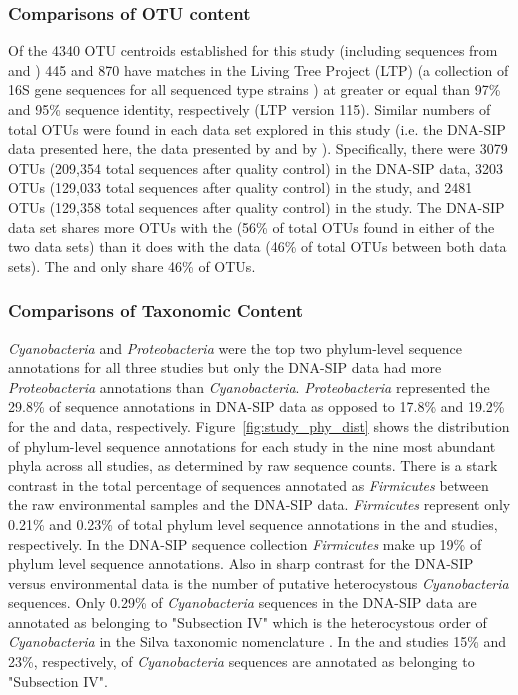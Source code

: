 \subsubsection{Comparisons of OTU content}
Of the 4340 OTU centroids established for this study (including sequences from \citet{Steven_2013} and \citep{Garcia_Pichel_2013}) 445 and 870 have matches in the Living Tree Project (LTP) (a collection of 16S gene sequences for all sequenced type strains \citep{Yarza_2008}) at greater or equal than 97\% and 95\% sequence identity, respectively (LTP version 115). Similar numbers of total OTUs were found in each data set explored in this study (i.e. the DNA-SIP data presented here, the data presented by \citet{Steven_2013} and by \citet{Garcia_Pichel_2013}). Specifically, there were 3079 OTUs (209,354 total sequences after quality control) in the DNA-SIP data, 3203 OTUs (129,033 total sequences after quality control) in the \citet{Garcia_Pichel_2013} study, and 2481 OTUs (129,358 total sequences after quality control) in the \citet{Steven_2013} study. The DNA-SIP data set shares more OTUs with the \citet{Steven_2013} (56\% of total OTUs found in either of the two data sets) than it does with the \citet{Garcia_Pichel_2013} data (46\% of total OTUs between both data sets). The \citet{Steven_2013} and \citet{Garcia_Pichel_2013} only share 46\% of OTUs.

\subsubsection{Comparisons of Taxonomic Content} 
\textit{Cyanobacteria} and \textit{Proteobacteria} were the top two phylum-level sequence annotations for all three studies but only the DNA-SIP data had more \textit{Proteobacteria} annotations than \textit{Cyanobacteria}. \textit{Proteobacteria} represented the 29.8\% of sequence annotations in DNA-SIP data as opposed to 17.8\% and 19.2\% for the \citet{Garcia_Pichel_2013} and \citet{Steven_2013} data, respectively. Figure~\ref{fig:study_phy_dist} shows the distribution of phylum-level sequence annotations for each study in the nine most abundant  phyla across all studies, as determined by raw sequence counts. There is a stark contrast in the total percentage of sequences annotated as \textit{Firmicutes} between the raw environmental samples and the DNA-SIP data. \textit{Firmicutes} represent only 0.21\% and 0.23\% of total phylum level sequence annotations in the \citet{Steven_2013} and \citet{Garcia_Pichel_2013} studies, respectively. In the DNA-SIP sequence collection \textit{Firmicutes} make up 19\% of phylum level sequence annotations. Also in sharp contrast for the DNA-SIP versus environmental data is the number of putative heterocystous \textit{Cyanobacteria} sequences. Only 0.29\% of \textit{Cyanobacteria} sequences in the DNA-SIP data are annotated as belonging to "Subsection IV" which is the heterocystous order of \textit{Cyanobacteria} in the Silva taxonomic nomenclature \citep{17947321}. In the \citet{Steven_2013} and \citet{Garcia_Pichel_2013} studies 15\% and 23\%, respectively, of \textit{Cyanobacteria} sequences are annotated as belonging to "Subsection IV".  

